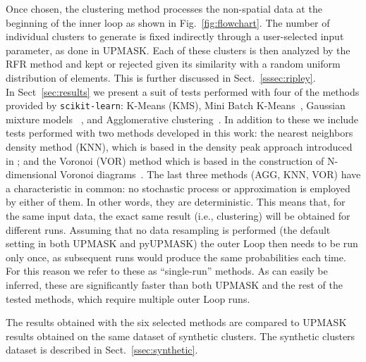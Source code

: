 \documentclass[draft]{aa}
\begin{document}
 Once chosen, the clustering method processes the non-spatial data at the
 beginning of the inner loop as shown in Fig.~\ref{fig:flowchart}. The number
 of individual clusters to generate is fixed indirectly through a
 user-selected input parameter, as done in UPMASK.
 Each of these clusters is then analyzed by the RFR method and kept or
 rejected given its similarity with a random uniform distribution of elements.
 This is further discussed in Sect.~\ref{sssec:ripley}.\\

 In Sect~\ref{sec:results} we present a suit of tests performed with
 four of the methods provided by \texttt{scikit-learn}: K-Means (KMS), Mini
 Batch K-Means~\citep[MBK,][]{Sculley2010}, Gaussian mixture models~
 \citep[GMM,][]{Baxter2010}, and Agglomerative
 clustering~\citep[AGG,][]{Zepeda2013}.
 In addition to these we include tests performed with two methods developed in
 this work: the nearest neighbors density method (KNN), which is based in the
 density peak approach introduced in \cite{Rodriguez2014}; and the 
 Voronoi (VOR) method which is based in the construction of N-dimensional
 Voronoi diagrams~\citep{Voronoi_1908}.
 The last three methods (AGG, KNN, VOR) have a characteristic in common:
 no stochastic process or approximation is employed by either of them. In
 other words, they are deterministic.
 This means that, for the same input data, the exact same result (i.e.,
 clustering) will be obtained for different runs.
 Assuming that no data resampling is performed (the default setting in both
 UPMASK and pyUPMASK) the outer Loop then needs to be run only once, as
 subsequent runs would produce the same probabilities each time. For this
 reason we refer to these as ``single-run'' methods. As can easily be
 inferred, these are significantly faster than both UPMASK and the rest of the
 tested methods, which require multiple outer Loop runs.

 The results obtained with the six selected methods are compared to UPMASK
 results obtained on the same dataset of synthetic clusters. The synthetic
 clusters dataset is described in  Sect.~\ref{ssec:synthetic}.
\end{document}
